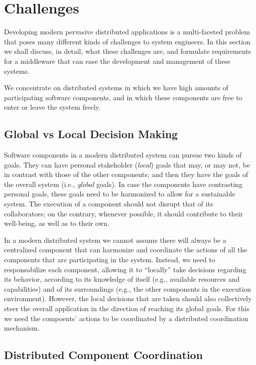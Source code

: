 
\section{Challenges}
\label{sec:problem}

Developing modern pervasive distributed applications is a multi-faceted problem that poses many different kinds of challenges to system engineers. In this section we shall discuss, in detail, what these challenges are, and formulate requirements for a middleware that can ease the development and management of these systems.

We concentrate on distributed systems in which we have high amounts of participating software components, and in which these components are free to enter or leave the system freely. 

\subsection{Global vs Local Decision Making}
\label{sub:globlaLocal}

Software components in a modern distributed system can pursue two kinds of goals. They can have personal stakeholder (\emph{local}) goals that may, or may not, be in contrast with those of the other components; and then they have the goals of the overall system (i.e., \emph{global} goals). In case the components have contrasting personal goals, these goals need to be harmonized to allow for a sustainable system. The execution of a component should not disrupt that of its collaborators; on the contrary, whenever possible, it should contribute to their well-being, as well as to their own. 

In a modern distributed system we cannot assume there will always be a centralized component that can harmonize and coordinate the actions of all the components that are participating in the system. Instead, we need to responsabilize each component, allowing it to ``locally'' take decisions regarding its behavior, according to its knowledge of itself (e.g., available resources and capabilities) and of its surroundings (e.g., the other components in the execution environment). However, the local decisions that are taken should also collectively steer the overall application in the direction of reaching its global goals. For this we need the compoents' actions to be coordinated by a distributed coordination mechanism.


\subsection{Distributed Component Coordination}
\label{sub:coordination}

